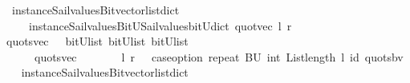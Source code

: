 \begin{isabellebody}
\ \ {\isacharparenleft}instance{\isacharunderscore}Sail{}{\isacharunderscore}values{\isacharunderscore}Bitvector{\isacharunderscore}list{\isacharunderscore}dict\isanewline
\ \ \ \ \ instance{\isacharunderscore}Sail{}{\isacharunderscore}values{\isacharunderscore}BitU{\isacharunderscore}Sail{}{\isacharunderscore}values{\isacharunderscore}bitU{\isacharunderscore}dict{\isacharparenright}\ {\isacharparenleft}quot{\isacharunderscore}vec\ l\ r{\isacharparenright}{\isacharparenright}{\isachardoublequoteclose}\isanewline
\isanewline
\isanewline
%
\isanewline
%
\isanewline
%
\isanewline
%
\isanewline
{}\isamarkupfalse%
\ quots{\isacharunderscore}vec\ \ {\isacharcolon}{\isacharcolon}\ {\isachardoublequoteopen}{\isacharparenleft}bitU{\isacharparenright}list\ {\isasymRightarrow}{\isacharparenleft}bitU{\isacharparenright}list\ {\isasymRightarrow}{\isacharparenleft}bitU{\isacharparenright}list\ {\isachardoublequoteclose}\ \ \ \isanewline
\ \ \ \ \ {\isachardoublequoteopen}\ quots{\isacharunderscore}vec\ \ \ \ \ \ \ \ l\ r\ {\isacharequal}\ {\isacharparenleft}\ case{\isacharunderscore}option\ {\isacharparenleft}repeat\ {\isacharbrackleft}BU{\isacharbrackright}\ {\isacharparenleft}int\ {\isacharparenleft}List{\isachardot}length\ l{\isacharparenright}{\isacharparenright}{\isacharparenright}\ id\ {\isacharparenleft}quots{\isacharunderscore}bv\ \isanewline
\ \ {\isacharparenleft}instance{\isacharunderscore}Sail{}{\isacharunderscore}values{\isacharunderscore}Bitvector{\isacharunderscore}list{\isacharunderscore}dict\isanewline

\end{isabellebody}
